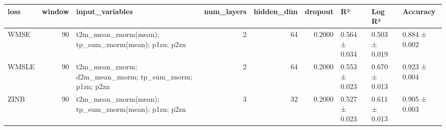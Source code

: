 \begin{tabular}{lrlrrrlll}
\toprule
loss & window & input\_variables & num\_layers & hidden\_dim & dropout & R² & Log R² & Accuracy \\
\midrule
WMSE & 90 & t2m\_mean\_znorm(mean); tp\_sum\_znorm(mean); p1zn; p2zn & 2 & 64 & 0.2000 & 0.564 ± 0.034 & 0.503 ± 0.019 & 0.884 ± 0.002 \\
WMSLE & 90 & t2m\_mean\_znorm; d2m\_mean\_znorm; tp\_sum\_znorm; p1zn; p2zn & 2 & 64 & 0.2000 & 0.553 ± 0.023 & 0.670 ± 0.013 & 0.923 ± 0.004 \\
ZINB & 90 & t2m\_mean\_znorm(mean); tp\_sum\_znorm(mean); p1zn; p2zn & 3 & 32 & 0.2000 & 0.527 ± 0.023 & 0.611 ± 0.013 & 0.905 ± 0.003 \\
\bottomrule
\end{tabular}
